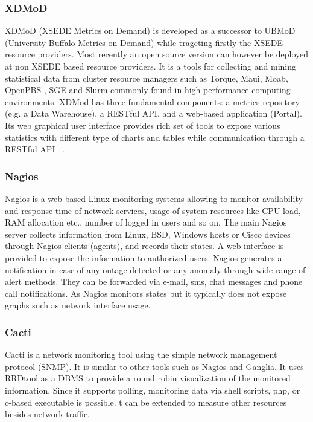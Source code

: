 \documentclass{sig-alternate-05-2015}
\begin{document}
\subsubsection{XDMoD}

XDMoD (XSEDE Metrics on Demand) \cite{las14cloudmeshmultiple,las14Impact,las12xdmod-kernel} is developed as a successor to UBMoD (University Buffalo Metrics on Demand) while trageting firstly the XSEDE resource providers. Most recently an open source version can however be deployed at non XSEDE based resource providers. It is a tools for collecting and mining statistical data from cluster resource managers such as Torque\cite{staples2006torque}, Maui\cite{jackson2001core}, Moab\cite{computing2012moab}, OpenPBS \cite{teambatching}, SGE\cite{gentzsch2001sun} and Slurm \cite{jette2010slurm} commonly found in high-performance computing environments. XDMod has three fundamental components: a metrics repository (e.g. a Data Warehouse), a RESTful API, and a web-based application (Portal).  Its web graphical user interface provides rich set of tools to expose various statistics with different type of charts and tables while communication through a RESTful API ~\cite{CPE:CPE2871,Furlani:2013:UXF:2484762.2484763}.

\subsubsection{Nagios}

Nagios \cite{barth2008nagios} is a web based Linux monitoring systems allowing to monitor availability and response time of network services, usage of system resources like CPU load, RAM allocation etc., number of logged in users and so on. The main Nagios server collects information from Linux, BSD, Windows hosts or Cisco devices through Nagios clients (agents), and records their states. A web interface is provided to expose the information to authorized users.  Nagios generates a notification in case of any outage detected or any anomaly through wide range of alert methods. They can be forwarded via e-mail, sms, chat messages and phone call notifications. As Nagios monitors states but it typically does not expose graphs such as network interface usage.

\subsubsection{Cacti}

Cacti is a network monitoring tool using the simple network management protocol (SNMP). It is similar to other tools such as Nagios \cite{barth2008nagios} and Ganglia. It uses RRDtool \cite{oetiker2005rrdtool} as a DBMS to provide a round robin visualization of the monitored information. Since it supports polling, monitoring data via shell scripts, php, or c-based executable is possible. t can be extended to measure other resources besides network traffic.
\end{document}
